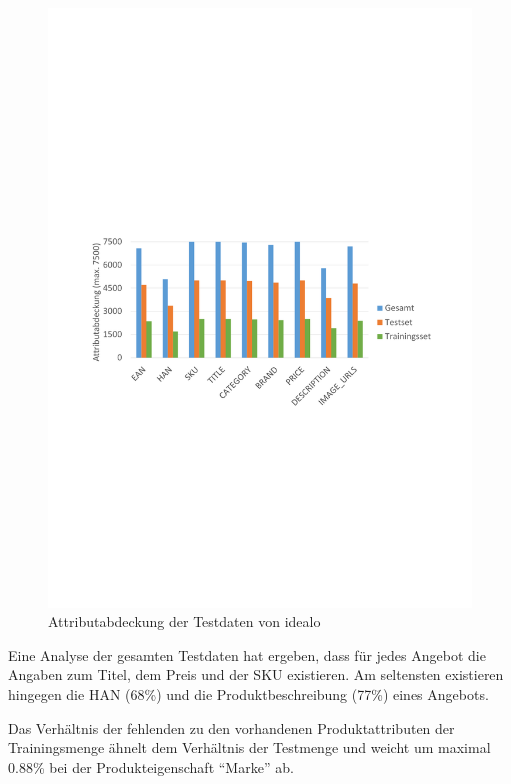 \begin{figure}[h]
    \centering
    \includegraphics[width=\textwidth, trim=0 10.05cm 0 11.4cm, clip]{resources/Testdaten-Attributverteilung.pdf}
    \caption{Attributabdeckung der Testdaten von idealo}
    \label{abb:testdaten}
    \vspace{-0.25cm}
\end{figure}

Eine Analyse der gesamten Testdaten hat ergeben, dass für jedes Angebot die Angaben zum Titel, dem Preis und der SKU
existieren.
Am seltensten existieren hingegen die HAN (68\%) und die Produktbeschreibung (77\%) eines Angebots.

Das Verhältnis der fehlenden zu den vorhandenen Produktattributen der Trainingsmenge ähnelt dem Verhältnis der
Testmenge und weicht um maximal 0.88\% bei der Produkteigenschaft ``Marke'' ab.

